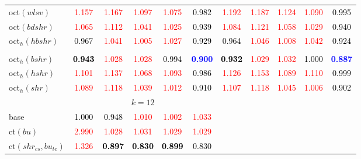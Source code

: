 \begin{tabular}[t]{l|>{}cccc>{}c|ccccc}
oct$(wlsv)$ & \textcolor{red}{1.157} & \textcolor{red}{1.167} & \textcolor{red}{1.097} & \textcolor{red}{1.075} & \textcolor{black}{0.982} & \textcolor{red}{1.192} & \textcolor{red}{1.187} & \textcolor{red}{1.124} & \textcolor{red}{1.090} & \textcolor{black}{0.995}\\
oct$(bdshr)$ & \textcolor{red}{1.065} & \textcolor{red}{1.112} & \textcolor{red}{1.041} & \textcolor{red}{1.025} & \textcolor{black}{0.939} & \textcolor{red}{1.084} & \textcolor{red}{1.121} & \textcolor{red}{1.058} & \textcolor{red}{1.029} & \textcolor{black}{0.940}\\
oct$_h(hbshr)$ & \textcolor{black}{0.967} & \textcolor{red}{1.041} & \textcolor{red}{1.005} & \textcolor{red}{1.027} & \textcolor{black}{0.929} & \textcolor{black}{0.964} & \textcolor{red}{1.046} & \textcolor{red}{1.008} & \textcolor{red}{1.042} & \textcolor{black}{0.924}\\[-1.5ex]
\hline\\[-1.5ex]
oct$_h(bshr)$ & \textcolor{black}{\textbf{0.943}} & \textcolor{red}{1.028} & \textcolor{red}{1.028} & \textcolor{black}{0.994} & \textcolor{blue}{\textbf{0.900}} & \textcolor{black}{\textbf{0.932}} & \textcolor{red}{1.029} & \textcolor{red}{1.032} & \textcolor{black}{1.000} & \textcolor{blue}{\textbf{0.887}}\\
oct$_h(hshr)$ & \textcolor{red}{1.101} & \textcolor{red}{1.137} & \textcolor{red}{1.068} & \textcolor{red}{1.093} & \textcolor{black}{0.986} & \textcolor{red}{1.126} & \textcolor{red}{1.153} & \textcolor{red}{1.089} & \textcolor{red}{1.110} & \textcolor{black}{0.999}\\
oct$_h(shr)$ & \textcolor{red}{1.089} & \textcolor{red}{1.118} & \textcolor{red}{1.039} & \textcolor{red}{1.012} & \textcolor{black}{0.910} & \textcolor{red}{1.107} & \textcolor{red}{1.118} & \textcolor{red}{1.045} & \textcolor{red}{1.006} & \textcolor{black}{0.902}\\
\addlinespace[0.3em]
\multicolumn{1}{c}{} & \multicolumn{5}{c}{\textbf{$k = 12$}} & \multicolumn{5}{c}{}\\
base & \textcolor{black}{1.000} & \textcolor{black}{0.948} & \textcolor{red}{1.010} & \textcolor{red}{1.002} & \textcolor{red}{1.033} &  &  &  &  & \\
ct$(bu)$ & \textcolor{red}{2.990} & \textcolor{red}{1.028} & \textcolor{red}{1.031} & \textcolor{red}{1.029} & \textcolor{red}{1.029} &  &  &  &  & \\
ct$(shr_{cs}, bu_{te})$ & \textcolor{red}{1.326} & \textcolor{black}{\textbf{0.897}} & \textcolor{black}{\textbf{0.830}} & \textcolor{black}{\textbf{0.899}} & \textcolor{black}{0.830} &  &  &  &  & \\

\end{tabular}
